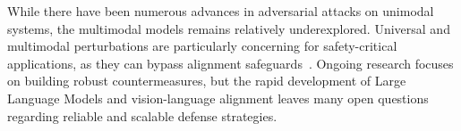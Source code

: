 While there have been numerous advances in adversarial attacks on unimodal systems, the multimodal models remains relatively underexplored. Universal and multimodal perturbations are particularly concerning for safety-critical applications, as they can bypass alignment safeguards~\cite{gu2024agent}. Ongoing research focuses on building robust countermeasures, but the rapid development of Large Language Models and vision-language alignment leaves many open questions regarding reliable and scalable defense strategies.